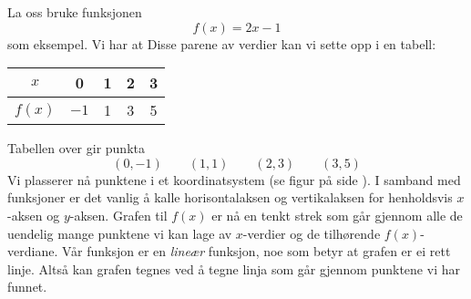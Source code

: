 La oss bruke funksjonen 
\[ f(x)=2x-1 \]
som eksempel. Vi har at
Disse parene av verdier kan vi sette opp i en tabell:
	\begin{center}
	\begin{tabular}{c | c |c |c|c}
		$ x $ & 0 & 1 & 2 & 3 \\ \hline
		$ f(x) $ &$  -1 $ & 1&3 &5
	\end{tabular}
\end{center}
Tabellen over gir punkta
\[ (0, -1)\quad\quad(1, 1)\quad\quad(2, 3)\quad\quad(3, 5) \]
Vi plasserer nå punktene i et koordinatsystem (se figur på side \pageref{funkfig}). I samband med funksjoner er det vanlig å kalle horisontalaksen og vertikalaksen for henholdsvis $ x $-aksen og $ y $-aksen. 
Grafen til $ f(x) $ er nå en tenkt strek som går gjennom alle de uendelig mange punktene vi kan lage av $ x$-verdier og de tilhørende $ f(x) $-verdiane. Vår funksjon er en \textit{lineær} funksjon, noe som betyr at grafen er ei rett linje. Altså kan grafen tegnes ved å tegne linja som går gjennom punktene vi har funnet.\vsk

